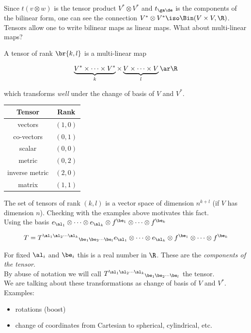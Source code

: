 \documentclass{article}
\begin{document}
Since $t (v \otimes w)$ is the tensor product $V^* \otimes V^*$ and $t_{\ga\de}$ is the components of the bilinear form, one can see the connection $V^* \otimes V^* \iso \Bin(V \times V, \R)$. \\

Tensors allow one to write bilinear maps as linear maps. What about multi-linear maps?


A tensor of rank $\br{k,l}$ is a multi-linear map

\[ \underbrace{V^* \times \cdots \times V^*}_{k} \times \underbrace{V \times \cdots \times V}_{l} \ar \R \]

which transforms \textit{well} under the change of basis of $V$ and $V^*$. \\

\begin{center}
\label{Tensor Examples}
\begin{tabular}{c|c}
Tensor & Rank \\
\hline
vectors & $(1,0)$ \\
co-vectors & $(0,1)$ \\
scalar & $(0,0)$ \\
metric & $(0,2)$ \\
inverse metric & $(2,0)$ \\
matrix & $(1,1)$ \\
\end{tabular}
\end{center}

The set of tensors of rank $(k,l)$ is a vector space of dimension $n^{k+l}$ (if $V$ has dimension $n$). Checking with the examples above motivates this fact. \\

Using the basis $e_{\al_1} \otimes \cdots \otimes e_{\al_k} \otimes f^{\be_1} \otimes \cdots \otimes f^{\be_k}$

\[ T = {T^{\al_1\al_2\cdots\al_k}}_{\be_1\be_2\cdots\be_l} e_{\al_1} \otimes \cdots \otimes e_{\al_k} \otimes f^{\be_1} \otimes \cdots \otimes f^{\be_k}\]

For fixed $\al_i$ and $\be_i$ this is a real number in $\R$. These are the \textit{components of the tensor}. \\

By abuse of notation we will call ${T^{\al_1\al_2\cdots\al_k}}_{\be_1\be_2\cdots\be_l}$ the tensor. \\

We are talking about these transformations as change of basis of $V$ and $V^*$. Examples:
\begin{itemize}
  \item rotations (boost)
  \item change of coordinates from Cartesian to spherical, cylindrical, etc.
\end{itemize}
\end{document}
